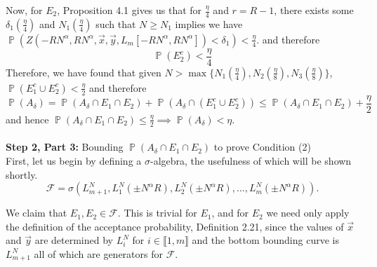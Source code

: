 \documentclass[12pt]{article}
\DeclareMathOperator{\pr}{\mathbb{P}}
\begin{document}
Now, for $E_2$, Proposition 4.1 gives us that for $\frac{\eta}{4}$ and $r=R-1$, there exists some $\delta_1(\frac\eta 4)$ and $N_1(\frac{\eta}{4})$ such that $N\geq N_1$ implies we have  $\pr\left(Z(-RN^\alpha, RN^\alpha, \vec x, \vec y, L_m[-RN^\alpha,RN^\alpha])<\delta_1\right)<\frac{\eta}{4}$. and therefore \[
\pr\left( E_2^c\right)<\frac{\eta}{4}
\]
Therefore, we have found that given $N>\max\{N_1(\frac{\eta}{4}),N_2(\frac{\eta}{8}),N_3(\frac{\eta}{8})\}$, $\pr(E_1^c\cup E_2^c)<\frac{\eta}{2}$ and therefore $$\pr(A_\delta)= \pr(A_\delta\cap E_1\cap E_2)+\pr(A_\delta\cap\left(E_1^c\cup E_2^c\right))\leq \pr(A_\delta\cap E_1\cap E_2)+\frac{\eta}{2}$$ and hence $\pr(A_\delta\cap E_1\cap E_2)\leq \frac{\eta}{2}\implies \pr(A_\delta)<\eta$.\\\\\noindent
\textbf{Step 2, Part 3:} Bounding $\pr(A_\delta\cap E_1\cap E_2)$ to prove Condition (2)\\
First, let us begin by defining a $\sigma$-algebra, the usefulness of which will be shown shortly. 
$$\mathcal{F}=\sigma\left(L_{m+1}^N,L_1^N(\pm N^\alpha R), L_2^N(\pm N^\alpha R),\dots, L_m^N(\pm N^\alpha R)\right).$$

We claim that $E_1, E_2\in \mathcal{F}$. This is trivial for $E_1$, and for $E_2$ we need only apply the definition of the acceptance probability, Definition 2.21, since the values of $\vec x$ and $\vec y$ are determined by $L_i^N$ for $i\in \llbracket 1,m\rrbracket$ and the bottom bounding curve is $L_{m+1}^N$ all of which are generators for $\mathcal{F}$.
\end{document}
